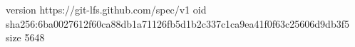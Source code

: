 version https://git-lfs.github.com/spec/v1
oid sha256:6ba0027612f60ca88db1a71126fb5d1b2c337c1ca9ea41f0f63c25606d9db3f5
size 5648
